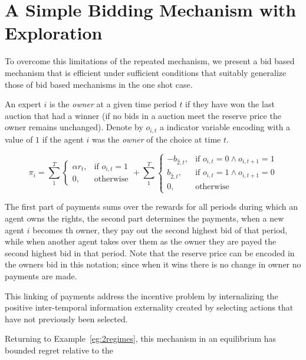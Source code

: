 \section{A Simple Bidding Mechanism with Exploration}

To overcome this limitations of the repeated mechanism, we present a bid based mechanism that is efficient under sufficient conditions that suitably generalize those of bid based mechanisms in the one shot case. 

\begin{mech}

An expert $i$ is the \emph{owner} at a given time period $t$ if they have won the last auction that had a winner (if no bids in a auction meet the reserve price the owner remains unchanged). 
Denote by $o_{i,t}$ a indicator variable encoding with a value of $1$ if the agent $i$ was the \emph{owner} of the choice at time $t$. 

\[
    \pi_i =  \sum_1^T
\begin{cases}
    \alpha r_t ,& \text{if } o_{i,t} = 1\\
    0,              & \text{otherwise}
\end{cases}
+
\sum_1^T
\begin{cases}
     - b_{\hat{2},t} ,& \text{if } o_{i,t} = 0 \land o_{i,t+1} = 1\\
      b_{\hat{2},t} ,& \text{if } o_{i,t}= 1 \land o_{i,t+1} = 0 \\
		0,              & \text{otherwise}
\end{cases}
\]

\end{mech}


The first part of payments sums over the rewards for all periods during which an agent owns the rights, the second part determines the payments, when a new agent $i$ becomes th owner, they pay out the second highest bid of that period, while when another agent takes over them as the owner they are payed the second highest bid in that period. Note that the reserve price can be encoded in the owners bid in this notation; since when it wins there is no change in owner no payments are made. 

This linking of payments address the incentive problem by internalizing the positive inter-temporal information externality created by selecting actions that have not previously been selected.


Returning to Example~\ref{eg:2regimes}, this mechanism in an equilibrium has bounded regret relative to the 

